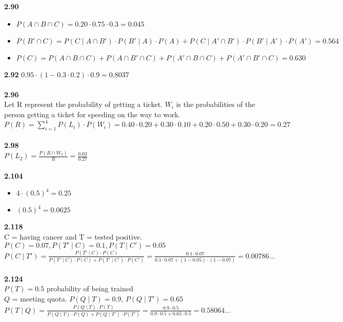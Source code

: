 \documentclass{article}
\begin{document}
    \textbf{2.90}
        \begin{itemize}
            \item $P(A\cap B \cap C) = 0.20 \cdot 0.75 \cdot 0.3 = 0.045$
            \item $P(B'\cap C) = P(C\mid A\cap B')\cdot P(B'\mid A)\cdot P(A) + P(C\mid A'\cap B')\cdot P(B'\mid A')\cdot P(A') = 0.564$
            \item $P(C) = P(A\cap B\cap C) + P(A\cap B'\cap C) + P(A'\cap B\cap C) + P(A'\cap B'\cap C) = 0.630$
        \end{itemize}
    \textbf{2.92}
        $0.95 \cdot (1 - 0.3 \cdot 0.2) \cdot 0.9 = 0.8037$\\\\
    \textbf{2.96}\\
        Let R represent the probability of getting a ticket. $W_i$ is the probabilities of the person getting a ticket for speeding on the way to work.\\
        $P(R) = \sum_{i=1}^{4}P(L_i) \cdot P(W_i) = 0.40\cdot 0.20 + 0.30 \cdot 0.10 + 0.20 \cdot 0.50 + 0.30 \cdot 0.20 = 0.27$\\\\
    \textbf{2.98}\\
        $P(L_2) = \frac{P(R\cap W_2)}{R} = \frac{0.03}{0.27}$\\\\
    \textbf{2.104}
        \begin{itemize}
            \item $4\cdot (0.5)^4 = 0.25$
            \item $(0.5)^4 = 0.0625$
        \end{itemize}
    \textbf{2.118}\\
        C = having cancer and T = tested positive.\\
        $P(C) = 0.07, P(T'\mid C) = 0.1, P(T\mid C') = 0.05$\\
        $P(C\mid T') = \frac{P(T'\mid C)\cdot P(C)}{P(T'\mid C)\cdot P(C) + P(T'\mid C')\cdot P(C')} = \frac{0.1 \cdot 0.07}{0.1 \cdot 0.07 + (1-0.05)\cdot(1-0.07)} = 0.00786...$\\\\
    \textbf{2.124}\\
        $P(T) = 0.5$ probability of being trained\\
        $Q$ = meeting quota. $P(Q\mid T)=0.9$, $P(Q\mid T')=0.65$\\
        $P(T\mid Q)= \frac{P(Q\mid T)\cdot P(T)}{P(Q\mid T)\cdot P(Q)+ P(Q\mid T')\cdot P(T')} = \frac{0.9\cdot 0.5}{0.9\cdot 0.5 + 0.65\cdot 0.5} = 0.58064...$
\end{document}
